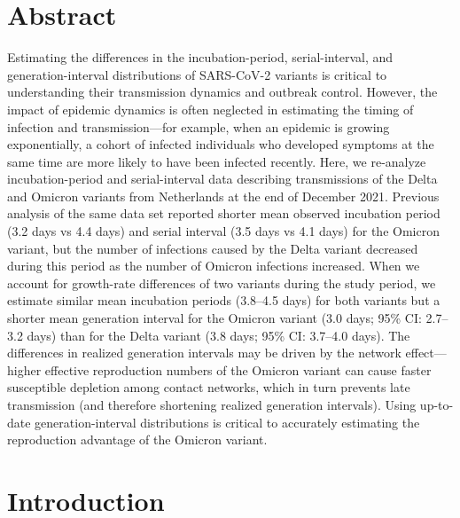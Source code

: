 \documentclass[12pt]{article}
\date{\today}
\begin{document}
\begin{flushleft}{
	\Large
	\textbf{}
}
\bigskip

\section*{Abstract}

Estimating the differences in the incubation-period, serial-interval, and generation-interval distributions of SARS-CoV-2 variants is critical to understanding their transmission dynamics and outbreak control.
However, the impact of epidemic dynamics is often neglected in estimating the timing of infection and transmission---for example, when an epidemic is growing exponentially, a cohort of infected individuals who developed symptoms at the same time are more likely to have been infected recently.
Here, we re-analyze incubation-period and serial-interval data describing transmissions of the Delta and Omicron variants from Netherlands at the end of December 2021.
Previous analysis of the same data set reported shorter mean observed incubation period (3.2 days vs 4.4 days) and serial interval (3.5 days vs 4.1 days) for the Omicron variant, but the number of infections caused by the Delta variant decreased during this period as the number of Omicron infections increased.
When we account for growth-rate differences of two variants during the study period, we estimate similar mean incubation periods (3.8--4.5 days) for both variants but a shorter mean generation interval for the Omicron variant (3.0 days; 95\% CI: 2.7--3.2 days) than for the Delta variant (3.8 days; 95\% CI: 3.7--4.0 days).
The differences in realized generation intervals may be driven by the network effect---higher effective reproduction numbers of the Omicron variant can cause faster susceptible depletion among contact networks, which in turn prevents late transmission (and therefore shortening realized generation intervals).
Using up-to-date generation-interval distributions is critical to accurately estimating the reproduction advantage of the Omicron variant.

\end{flushleft}

\pagebreak

\section{Introduction}
\end{document}
